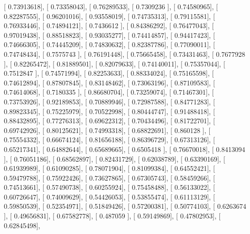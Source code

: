 \documentclass{article}
\begin{document}
       [ 0.73913618],
       [ 0.73358043],
       [ 0.76289533],
       [ 0.7309236 ],
       [ 0.74580965],
       [ 0.82287555],
       [ 0.96201016],
       [ 0.93558019],
       [ 0.74735313],
       [ 0.79115581],
       [ 0.76933446],
       [ 0.74894121],
       [ 0.7436612 ],
       [ 0.84386292],
       [ 0.76477043],
       [ 0.97019438],
       [ 0.88518823],
       [ 0.93035277],
       [ 0.74414857],
       [ 0.94417423],
       [ 0.74666305],
       [ 0.74445209],
       [ 0.74830632],
       [ 0.82387786],
       [ 0.77090011],
       [ 0.74748434],
       [ 0.7575743 ],
       [ 0.76191448],
       [ 0.75665458],
       [ 0.73431463],
       [ 0.7677928 ],
       [ 0.82265472],
       [ 0.81889501],
       [ 0.82079633],
       [ 0.74140011],
       [ 0.75357044],
       [ 0.7512847 ],
       [ 0.74571994],
       [ 0.82253633],
       [ 0.88334024],
       [ 0.75165598],
       [ 0.74612894],
       [ 0.87807845],
       [ 0.83148462],
       [ 0.73063196],
       [ 0.87109583],
       [ 0.74614068],
       [ 0.7180335 ],
       [ 0.86680704],
       [ 0.73259074],
       [ 0.71467301],
       [ 0.73753926],
       [ 0.92189853],
       [ 0.70889946],
       [ 0.72987588],
       [ 0.84771283],
       [ 0.89823345],
       [ 0.75225979],
       [ 0.70522998],
       [ 0.80444747],
       [ 0.91488418],
       [ 0.88432895],
       [ 0.77276313],
       [ 0.69622312],
       [ 0.70434496],
       [ 0.81722701],
       [ 0.69742926],
       [ 0.80125621],
       [ 0.74993318],
       [ 0.68822691],
       [ 0.860128  ],
       [ 0.75554332],
       [ 0.66674124],
       [ 0.81656188],
       [ 0.86396729],
       [ 0.67313126],
       [ 0.65217341],
       [ 0.64882644],
       [ 0.65689665],
       [ 0.6505418 ],
       [ 0.76670018],
       [ 0.8413094 ],
       [ 0.76051186],
       [ 0.68562897],
       [ 0.82431729],
       [ 0.62038789],
       [ 0.63390169],
       [ 0.61939989],
       [ 0.61090285],
       [ 0.78071904],
       [ 0.81099384],
       [ 0.64552421],
       [ 0.59479788],
       [ 0.75922426],
       [ 0.73627865],
       [ 0.67305743],
       [ 0.58459266],
       [ 0.74513661],
       [ 0.57490738],
       [ 0.60255924],
       [ 0.75458488],
       [ 0.56133022],
       [ 0.60726647],
       [ 0.74009629],
       [ 0.54426053],
       [ 0.53855474],
       [ 0.61113129],
       [ 0.59850539],
       [ 0.52354971],
       [ 0.51849426],
       [ 0.57200381],
       [ 0.50774103],
       [ 0.6263674 ],
       [ 0.49656831],
       [ 0.67582778],
       [ 0.487059  ],
       [ 0.59149869],
       [ 0.47802953],
       [ 0.62845498],
\end{document}
